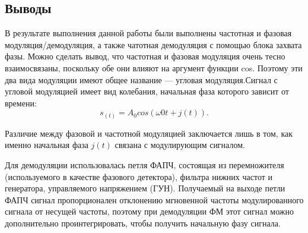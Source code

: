 \documentclass[10pt,a4paper]{article}
\begin{document}
\subsection{Выводы}
В результате выполнения данной работы были выполнены частотная и фазовая модуляция/демодуляция, а также чатотная демодуляция с  помощью блока захвата фазы. Можно сделать вывод, что частотная и фазовая модуляция очень тесно взаимосвязаны, поскольку обе они влияют на аргумент функции cos. Поэтому эти два вида модуляции имеют общее название — угловая модуляция.Сигнал с угловой модуляцией имеет вид колебания, начальная фаза которого зависит от времени:
	\begin{equation}
	s_(t) = A_0 cos(\omega0 t + j(t)).
	\end{equation}

Различие между фазовой и частотной модуляцией заключается лишь в том, как именно начальная фаза $j(t)$ связана с модулирующим сигналом.

Для демодуляции использовалась петля ФАПЧ, состоящая из перемножителя (используемого в качестве фазового детектора), фильтра нижних частот и генератора, управляемого напряжением (ГУН). Получаемый на выходе петли ФАПЧ сигнал пропорционален отклонению мгновенной частоты модулированного сигнала от несущей частоты, поэтому при демодуляции ФМ этот сигнал можно дополнительно проинтегрировать, чтобы получить начальную фазу сигнала.
\end{document}
